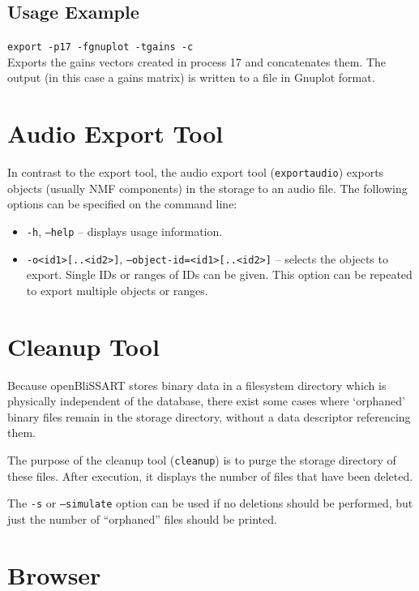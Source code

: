 \subsection{Usage Example}

{\tt export -p17 -fgnuplot -tgains -c}\\
Exports the gains vectors created in
process 17 and concatenates them. The output (in this case a gains matrix) 
is written to a file in Gnuplot format.


\section{Audio Export Tool}

In contrast to the export tool, the audio export tool ({\tt exportaudio})
exports objects (usually NMF components) in the storage to an audio file.
\noindent The following options can be specified on the command line:
\begin{itemize}
  \item {\tt -h}, {\tt --help} -- displays usage information.
  \item {\tt -o<id1>[..<id2>]}, {\tt --object-id=<id1>[..<id2>]}
    -- selects the objects to export. Single IDs or ranges of IDs can be given.
    This option can be repeated to export multiple objects or ranges.
\end{itemize}


\section{Cleanup Tool}

Because openBliSSART stores binary data in a filesystem directory which is
physically independent of the database, there exist some cases where
`orphaned' binary files remain in the storage directory, without a data
descriptor referencing them.

The purpose of the cleanup tool ({\tt cleanup}) is to purge the storage
directory of these files. After execution, it displays the number of files that
have been deleted.

The {\tt -s} or {\tt --simulate} option can be used if no deletions should
be performed, but just the number of ``orphaned'' files should be printed.


\section{Browser}
\label{section:browser}

